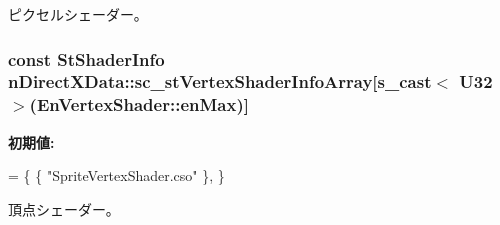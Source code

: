 ピクセルシェーダー。 

\hypertarget{namespacen_direct_x_data_a979e2d1f73921e7addcba315847438ce}{}
\subsubsection[{sc\+\_\+st\+Vertex\+Shader\+Info\+Array}]{\setlength{\rightskip}{0pt plus 5cm}const {\bf St\+Shader\+Info} n\+Direct\+X\+Data\+::sc\+\_\+st\+Vertex\+Shader\+Info\+Array\mbox{[}{\bf s\+\_\+cast}$<$ U32 $>$({\bf En\+Vertex\+Shader\+::en\+Max})\mbox{]}}\label{namespacen_direct_x_data_a979e2d1f73921e7addcba315847438ce}
{\bfseries 初期値\+:}
\begin{DoxyCode}
=
    \{
        \{ \textcolor{stringliteral}{"SpriteVertexShader.cso"} \},
    \}
\end{DoxyCode}


頂点シェーダー。 


